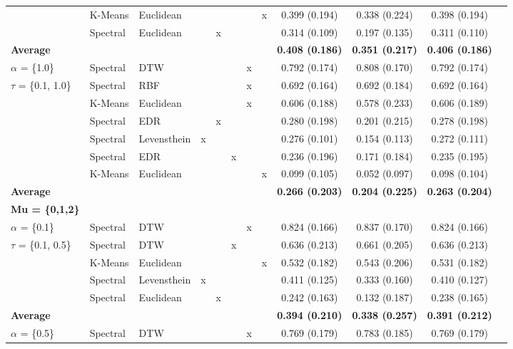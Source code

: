 \documentclass[12pt,a4paper,bibliography=totocnumbered,listof=totocnumbered]{scrartcl}
\begin{document}
\begin{threeparttable}[!htbp]
{\begin{tabular}{@{\extracolsep{0pt}} lllccccccccc}
		& K-Means & Euclidean &  &  &  &  & x & 0.399 (0.194)  & 0.338 (0.224) & 0.398 (0.194) \\ 
		& Spectral & Euclidean &  & x &  &  &  & 0.314 (0.109) & 0.197 (0.135) & 0.311 (0.110) \\ 
		\hline
		\textbf{Average} &  &  &  &  &  &  &  &   \textbf{0.408 (0.186)} &  \textbf{0.351 (0.217)} &  \textbf{0.406 (0.186)} \\ 
		\hline
		$\alpha$ = \{1.0\} & Spectral  & DTW &  &  &  & x &  & 0.792 (0.174) & 0.808 (0.170) & 0.792 (0.174) \\ 
		$\tau$ = \{0.1, 1.0\} & Spectral  & RBF &  &  &  & x &  & 0.692 (0.164) & 0.692 (0.184) & 0.692 (0.164) \\ 
		& K-Means & Euclidean  &  &  &  & x &  & 0.606 (0.188) & 0.578 (0.233) & 0.606 (0.189) \\ 
		& Spectral  & EDR &  & x &  &  &  & 0.280 (0.198) & 0.201 (0.215) & 0.278 (0.198) \\ 
		& Spectral  & Levensthein & x &  &  &  &  & 0.276 (0.101) & 0.154 (0.113) & 0.272 (0.111) \\ 
		& Spectral  & EDR &  &  & x &  &  & 0.236 (0.196) & 0.171 (0.184) & 0.235 (0.195) \\ 
		& K-Means & Euclidean  &  &  &  &  & x & 0.099 (0.105) & 0.052 (0.097) & 0.098 (0.104) \\ 
		\hline
		\textbf{Average} &  &  &  &  &  &  &  &   \textbf{0.266 (0.203)} &  \textbf{0.204 (0.225)} &  \textbf{0.263 (0.204)} \\ 
		\hline
		\textbf{Mu = \{0,1,2\}} &  &  &  &  &  &  &  &  &  &  \\ 
		\hline
		$\alpha$ =  \{0.1\} & Spectral & DTW &  &  &  & x &  & 0.824 (0.166) & 0.837 (0.170) & 0.824 (0.166) \\ 
	$\tau$ = 	\{0.1, 0.5\} & Spectral & DTW &  &  & x &  &  & 0.636 (0.213) & 0.661 (0.205) & 0.636 (0.213) \\ 
		& K-Means & Euclidean &  &  &  &  & x & 0.532 (0.182) & 0.543 (0.206) & 0.531 (0.182) \\ 
		& Spectral & Levensthein & x &  &  &  &  & 0.411 (0.125) & 0.333 (0.160) & 0.410 (0.127) \\ 
		& Spectral & Euclidean &  & x &  &  &  & 0.242 (0.163) & 0.132 (0.187) & 0.238 (0.165) \\ 
		\hline
		\textbf{Average} &  &  &  &  &  &  &  &  \textbf{0.394 (0.210)} &  \textbf{0.338 (0.257)} &  \textbf{0.391 (0.212)} \\ 
		\hline
		$\alpha$ = \{0.5\} & Spectral & DTW &  &  &  & x &  & 0.769 (0.179) & 0.783 (0.185) & 0.769 (0.179) \\ 

\end{tabular}}
\end{threeparttable}
\end{document}

